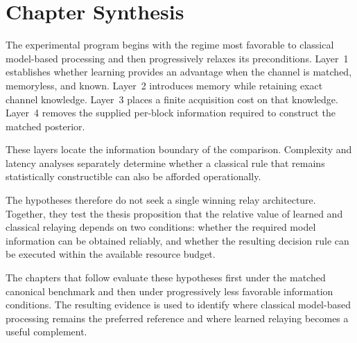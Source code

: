 \section{Chapter Synthesis}
\label{sec:research-objectives-synthesis}

The experimental program begins with the regime most favorable to classical
model-based processing and then progressively relaxes its preconditions.
Layer~1 establishes whether learning provides an advantage when the channel is
matched, memoryless, and known. Layer~2 introduces memory while retaining
exact channel knowledge. Layer~3 places a finite acquisition cost on that
knowledge. Layer~4 removes the supplied per-block information required to
construct the matched posterior.

These layers locate the information boundary of the comparison. Complexity
and latency analyses separately determine whether a classical rule that
remains statistically constructible can also be afforded operationally.

The hypotheses therefore do not seek a single winning relay architecture.
Together, they test the thesis proposition that the relative value of learned
and classical relaying depends on two conditions: whether the required model
information can be obtained reliably, and whether the resulting decision rule
can be executed within the available resource budget.

The chapters that follow evaluate these hypotheses first under the matched
canonical benchmark and then under progressively less favorable information
conditions. The resulting evidence is used to identify where classical
model-based processing remains the preferred reference and where learned
relaying becomes a useful complement.